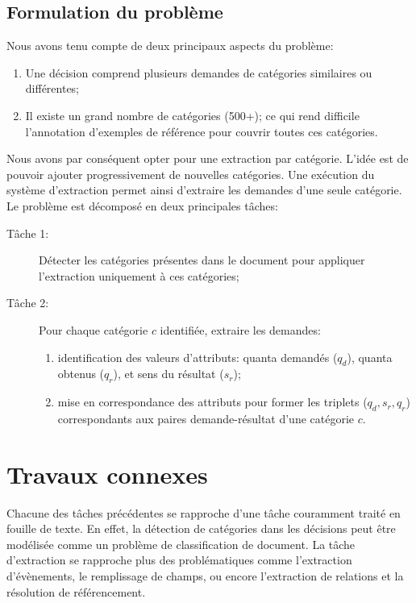 

\subsection{Formulation du problème}
\label{sec:quanta:formulation}

Nous avons tenu compte de deux principaux aspects du problème:
\begin{enumerate}
	\item Une décision comprend plusieurs demandes de catégories similaires ou différentes;
	\item  Il existe un grand nombre de catégories (500+); ce qui rend difficile l'annotation d'exemples de référence pour couvrir toutes ces catégories.
\end{enumerate}

Nous avons par conséquent opter pour une extraction par catégorie. L'idée est de pouvoir ajouter progressivement de nouvelles catégories. Une exécution du système d'extraction permet ainsi d'extraire les demandes d'une seule catégorie. Le problème est décomposé en deux principales tâches:
\begin{description}
	\item[Tâche 1:] Détecter les catégories présentes dans le document pour appliquer l'extraction  uniquement à ces catégories;
	\item[Tâche 2:] Pour chaque catégorie $c$ identifiée, extraire les demandes:
	\begin{enumerate}
		\item identification des valeurs d'attributs: quanta demandés ($q_d$), quanta obtenus ($q_r$), et sens du résultat ($s_r$);
		\item mise en correspondance des attributs pour former les triplets ($q_d, s_r, q_r$) correspondants aux paires demande-résultat d'une catégorie $c$.
	\end{enumerate}
\end{description}

 
\section{Travaux connexes}
\label{sec:quanta:biblio}
Chacune des tâches précédentes se rapproche d'une tâche couramment traité en fouille de texte. En effet, la détection de catégories dans les décisions peut être modélisée comme un problème de classification de document. La tâche d'extraction se rapproche plus des problématiques  comme l'extraction d'évènements, le remplissage de champs, ou encore l'extraction de relations et la résolution de référencement.

